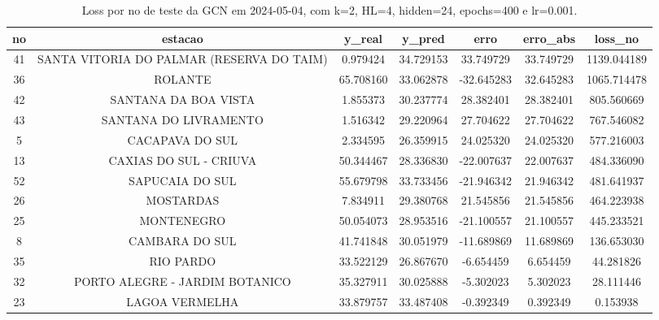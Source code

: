\begin{table}[h]
\centering
\caption{Loss por no de teste da GCN em 2024-05-04, com k=2, HL=4, hidden=24, epochs=400 e lr=0.001.}
\label{tab:gcn_loss_k2_hl4_h24_e400_d20240504}
\begin{tabular}{ccccccc}
\toprule
no & estacao & y\_real & y\_pred & erro & erro\_abs & loss\_no \\
\midrule
41 & SANTA VITORIA DO PALMAR (RESERVA DO TAIM) & 0.979424 & 34.729153 & 33.749729 & 33.749729 & 1139.044189 \\
36 & ROLANTE & 65.708160 & 33.062878 & -32.645283 & 32.645283 & 1065.714478 \\
42 & SANTANA DA BOA VISTA & 1.855373 & 30.237774 & 28.382401 & 28.382401 & 805.560669 \\
43 & SANTANA DO LIVRAMENTO & 1.516342 & 29.220964 & 27.704622 & 27.704622 & 767.546082 \\
5 & CACAPAVA DO SUL & 2.334595 & 26.359915 & 24.025320 & 24.025320 & 577.216003 \\
13 & CAXIAS DO SUL - CRIUVA & 50.344467 & 28.336830 & -22.007637 & 22.007637 & 484.336090 \\
52 & SAPUCAIA DO SUL & 55.679798 & 33.733456 & -21.946342 & 21.946342 & 481.641937 \\
26 & MOSTARDAS & 7.834911 & 29.380768 & 21.545856 & 21.545856 & 464.223938 \\
25 & MONTENEGRO & 50.054073 & 28.953516 & -21.100557 & 21.100557 & 445.233521 \\
8 & CAMBARA DO SUL & 41.741848 & 30.051979 & -11.689869 & 11.689869 & 136.653030 \\
35 & RIO PARDO & 33.522129 & 26.867670 & -6.654459 & 6.654459 & 44.281826 \\
32 & PORTO ALEGRE - JARDIM BOTANICO & 35.327911 & 30.025888 & -5.302023 & 5.302023 & 28.111446 \\
23 & LAGOA VERMELHA & 33.879757 & 33.487408 & -0.392349 & 0.392349 & 0.153938 \\
\bottomrule
\end{tabular}
\end{table}
